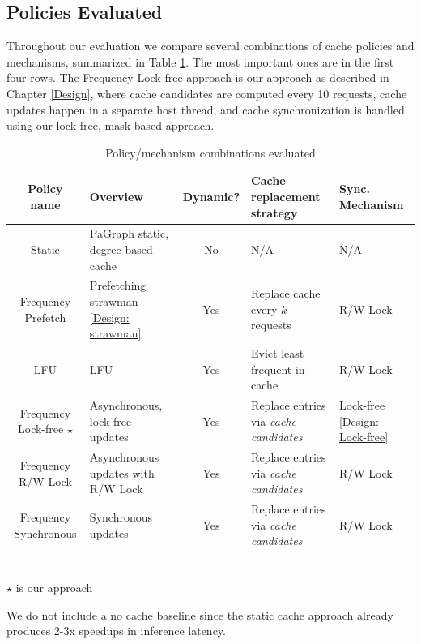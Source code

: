 \subsection{Policies Evaluated}
Throughout our evaluation we compare several combinations of cache policies and mechanisms, summarized in Table \ref{Eval: Policy names}. 
The most important ones are in the first four rows. 
The Frequency Lock-free approach is our approach as described in Chapter \ref{Design}, where cache candidates are computed every 10 requests, cache updates happen in a separate host thread, and cache synchronization is handled using our lock-free, mask-based approach.
\begin{table}[h!]
    \begin{center}
        \begin{tabularx}{\textwidth}{|c X c X X|} 
        \hline
        \textbf{Policy name} & \textbf{Overview} & \textbf{Dynamic?} & \textbf{Cache replacement strategy} & \textbf{Sync. Mechanism}\\ [0.5ex] 
        \hline\hline
        Static & PaGraph static, degree-based cache & No & N/A & N/A \\
        \hline
        Frequency Prefetch & Prefetching strawman \ref{Design: strawman} & Yes & Replace cache every $k$ requests & R/W Lock \\
        \hline
        LFU & LFU & Yes & Evict least frequent in cache & R/W Lock \\
        \hline
        Frequency Lock-free $\star$ & Asynchronous, lock-free updates & Yes & Replace entries via \textit{cache candidates} & Lock-free \ref{Design: Lock-free} \\
        \hline
        Frequency R/W Lock & Asynchronous updates with R/W Lock & Yes & Replace entries via \textit{cache candidates} & R/W Lock \\
        \hline
        Frequency Synchronous & Synchronous updates & Yes & Replace entries via \textit{cache candidates} & R/W Lock \\
        \hline
        \end{tabularx} \\
        $\star$ is our approach
    \end{center}
    \caption{Policy/mechanism combinations evaluated}
    \label{Eval: Policy names}
\end{table}
We do not include a no cache baseline since the static cache approach already produces 2-3x speedups in inference latency.

